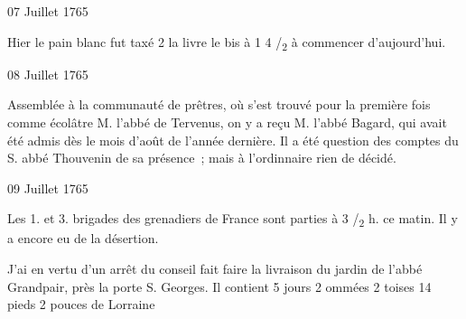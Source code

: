                      
                     

                     \begin{diary}{07 Juillet 1765}{}
                        
                         Hier le pain blanc fut taxé 2 la livre
                           le bis à 1 4
                           /\textsubscript{2} à commencer d'aujourd'hui.
                        \bigskip
        
        
                     \end{diary}

                     \begin{diary}{08 Juillet 1765}{}
                        
                         Assemblée à la communauté de prêtres,
                           où
                           s'est trouvé pour la première fois comme
                           écolâtre M. l'abbé de Tervenus,
                           on y a reçu
                           M. l'abbé Bagard, qui avait
                           été admis dès
                           le mois d'août de l'année dernière.
                           Il a été
                           question des comptes du S. abbé
                              Thouvenin
                           de sa présence ; mais à l'ordinnaire rien de décidé. \bigskip
        
        
                     \end{diary}

                     \begin{diary}{09 Juillet 1765}{}
                        
                         Les 1. et
                              3. brigades des grenadiers
                           de France sont parties à 3 /\textsubscript{2} h. ce matin.
                           Il y a encore eu de la désertion. \bigskip
        
        
                         J'ai en vertu d'un arrêt du conseil
                           fait faire la livraison du jardin de
                           l'abbé Grandpair, près
                              la porte S.
                              Georges.
                           Il contient 5 jours 2 ommées 2 toises 14 pieds 2 pouces de Lorraine
                        \bigskip
        
        
                     \end{diary}

